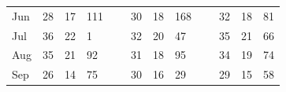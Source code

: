 \documentclass[agronomy,article,submit,moreauthors,pdftex,10pt,a4paper]{mdpi}
\theoremstyle{mdpi}
\theoremstyle{mdpidefinition}
\begin{document}
\begin{table}
\begin{tabular}{llllllllllll}
Jun                    & 28                                                                       & 17                                                                       & 111                                                                     & ~ & 30                                                                       & 18                                                                       & 168                                                                     & ~ & 32                                                                      & 18                                                                       & 81                                                                      \\
Jul                    & 36                                                                       & 22                                                                       & 1                                                                       & ~ & 32                                                                       & 20                                                                       & 47                                                                      & ~ & 35                                                                      & 21                                                                       & 66                                                                      \\
Aug                    & 35                                                                       & 21                                                                       & 92                                                                      & ~ & 31                                                                       & 18                                                                       & 95                                                                      & ~ & 34                                                                      & 19                                                                       & 74                                                                      \\
Sep                    & 26                                                                       & 14                                                                       & 75                                                                      & ~ & 30                                                                       & 16                                                                       & 29                                                                      & ~ & 29                                                                      & 15                                                                       & 58                                                                      \\

\end{tabular}
\end{table}
\end{document}
